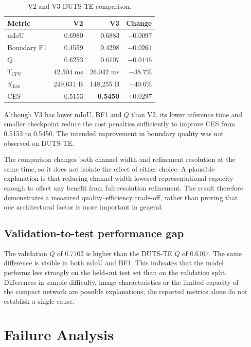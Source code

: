\documentclass[10pt,a4paper]{article}
\begin{document}
\begin{table}[H]
\centering
\small
\caption{V2 and V3 DUTS-TE comparison.}
\begin{tabular}{@{}l r r r@{}}
\toprule
\textbf{Metric} & \textbf{V2} & \textbf{V3} & \textbf{Change}\\
\midrule
mIoU & 0.6980 & 0.6883 & $-0.0097$\\
Boundary F1 & 0.4559 & 0.4298 & $-0.0261$\\
$Q$ & 0.6253 & 0.6107 & $-0.0146$\\
$T_{\mathrm{CPU}}$ & 42.504 ms & 26.042 ms & $-38.7\%$\\
$S_{\mathrm{disk}}$ & 249,631 B & 148,255 B & $-40.6\%$\\
CES & 0.5153 & \textbf{0.5450} & $+0.0297$\\
\bottomrule
\end{tabular}
\end{table}

Although V3 has lower mIoU, BF1 and $Q$ than V2, its lower inference time and smaller checkpoint reduce the cost penalties sufficiently to improve CES from 0.5153 to 0.5450. The intended improvement in boundary quality was not observed on DUTS-TE.

The comparison changes both channel width and refinement resolution at the same time, so it does not isolate the effect of either choice. A plausible explanation is that reducing channel width lowered representational capacity enough to offset any benefit from full-resolution refinement. The result therefore demonstrates a measured quality--efficiency trade-off, rather than proving that one architectural factor is more important in general.

\subsection{Validation-to-test performance gap}

The validation $Q$ of 0.7702 is higher than the DUTS-TE $Q$ of 0.6107. The same difference is visible in both mIoU and BF1. This indicates that the model performs less strongly on the held-out test set than on the validation split. Differences in sample difficulty, image characteristics or the limited capacity of the compact network are possible explanations; the reported metrics alone do not establish a single cause.

\clearpage
\section{Failure Analysis}\label{sec:failure-analysis}
\end{document}
